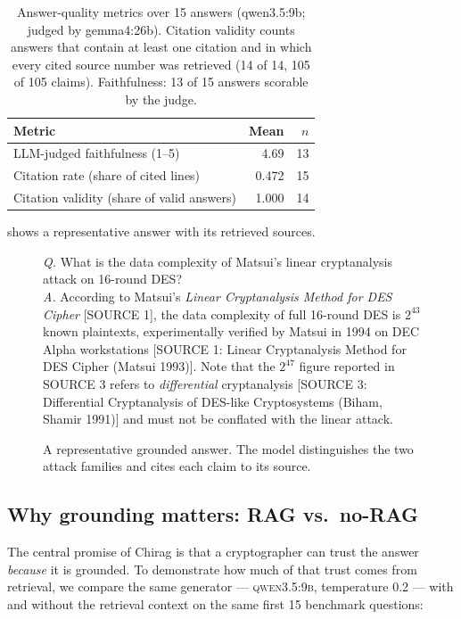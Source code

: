 \documentclass[version=submission]{iacrcc}
\begin{document}
\begin{table}[t]
\centering
\caption{Answer-quality metrics over 15 answers (qwen3.5:9b; judged by
gemma4:26b). Citation validity counts answers that contain at least one
citation and in which every cited source number was retrieved (14 of 14,
105 of 105 claims). Faithfulness: 13 of 15 answers scorable by the judge.}
\label{tab:eval4}
\begin{tabular}{lrr}
\toprule
Metric & Mean & $n$\\
\midrule
LLM-judged faithfulness (1--5) & 4.69 & 13\\
Citation rate (share of cited lines) & 0.472 & 15\\
Citation validity (share of valid answers) & 1.000 & 14\\
\bottomrule
\end{tabular}
\end{table}

 shows a representative answer with its retrieved sources.

\begin{figure}[t]
\centering
\small
\begin{minipage}{0.95\linewidth}
\emph{Q.} What is the data complexity of Matsui's linear cryptanalysis attack
on 16-round DES?\\[1mm]
\emph{A.} According to Matsui's \emph{Linear Cryptanalysis Method for DES
Cipher} [SOURCE 1], the data complexity of full 16-round DES is $2^{43}$
known plaintexts, experimentally verified by Matsui in 1994 on DEC Alpha
workstations [SOURCE 1: Linear Cryptanalysis Method for DES Cipher (Matsui
1993)]. Note that the $2^{47}$ figure reported in SOURCE 3 refers to
\emph{differential} cryptanalysis [SOURCE 3: Differential Cryptanalysis of
DES-like Cryptosystems (Biham, Shamir 1991)] and must not be conflated with
the linear attack.
\end{minipage}
\caption{A representative grounded answer. The model distinguishes the two
attack families and cites each claim to its source.}
\label{fig:example}
\end{figure}

\subsection{Why grounding matters: RAG vs.\ no-RAG}
\label{sec:ragbaseline}

The central promise of Chirag is that a cryptographer can trust the answer
\emph{because} it is grounded. To demonstrate how much of that trust comes
from retrieval, we compare the same generator --- \textsc{qwen3.5:9b},
temperature 0.2 --- with and without the retrieval context on the same first
15 benchmark questions:
\end{document}
